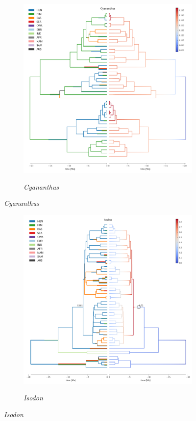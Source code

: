 \begin{figure}
  \ContinuedFloat
\begin{subfigure}{\textwidth}
\centering
\includegraphics[width=.99\linewidth]{figures/Cyananthus-supfig.pdf}
\label{fig:allium}
\caption{\textit{Cyananthus}}
\end{subfigure}
\end{figure}

\begin{figure}
  \ContinuedFloat
\begin{subfigure}{\textwidth}
\centering
\includegraphics[width=.99\linewidth]{figures/Isodon-supfig.pdf}
\label{fig:allium}
\caption{\textit{Isodon}}
\end{subfigure}
\end{figure}

